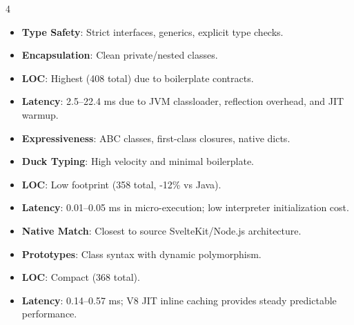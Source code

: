 \documentclass[landscape,10pt,a4paper]{article}
\begin{document}
\vspace{-2mm}

\begin{multicols}{4}

\begin{tcolorbox}[title=\textbf{Java (OOP / JVM)},colback=white,colframe=headerblue!80,arc=2mm,boxrule=0.5pt,top=1mm,bottom=1mm,left=1.5mm,right=1.5mm]
\scriptsize
\begin{itemize}[leftmargin=*,noitemsep]
\item \textbf{Type Safety}: Strict interfaces, generics, explicit type checks.
\item \textbf{Encapsulation}: Clean private/nested classes.
\item \textbf{LOC}: Highest (408 total) due to boilerplate contracts.
\item \textbf{Latency}: 2.5--22.4 ms due to JVM classloader, reflection overhead, and JIT warmup.
\end{itemize}
\end{tcolorbox}

\begin{tcolorbox}[title=\textbf{Python (Dynamic / ABC)},colback=white,colframe=headerblue!80,arc=2mm,boxrule=0.5pt,top=1mm,bottom=1mm,left=1.5mm,right=1.5mm]
\scriptsize
\begin{itemize}[leftmargin=*,noitemsep]
\item \textbf{Expressiveness}: ABC classes, first-class closures, native dicts.
\item \textbf{Duck Typing}: High velocity and minimal boilerplate.
\item \textbf{LOC}: Low footprint (358 total, -12\% vs Java).
\item \textbf{Latency}: 0.01--0.05 ms in micro-execution; low interpreter initialization cost.
\end{itemize}
\end{tcolorbox}

\begin{tcolorbox}[title=\textbf{JavaScript (ESM / V8)},colback=white,colframe=headerblue!80,arc=2mm,boxrule=0.5pt,top=1mm,bottom=1mm,left=1.5mm,right=1.5mm]
\scriptsize
\begin{itemize}[leftmargin=*,noitemsep]
\item \textbf{Native Match}: Closest to source SvelteKit/Node.js architecture.
\item \textbf{Prototypes}: Class syntax with dynamic polymorphism.
\item \textbf{LOC}: Compact (368 total).
\item \textbf{Latency}: 0.14--0.57 ms; V8 JIT inline caching provides steady predictable performance.
\end{itemize}
\end{tcolorbox}


\end{multicols}
\end{document}
